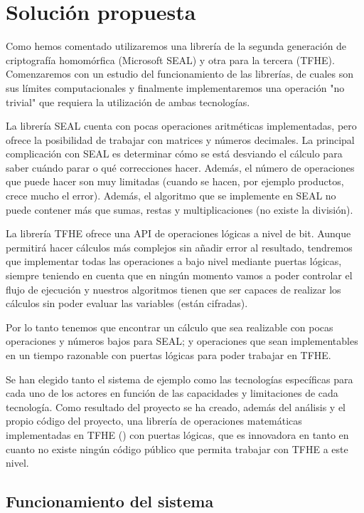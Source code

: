 \chapter{Solución propuesta}
\label{chap:poc}

Como hemos comentado utilizaremos una librería de la segunda generación de criptografía homomórfica (Microsoft SEAL) y otra para la tercera (TFHE). Comenzaremos con un estudio del funcionamiento de las librerías, de cuales son sus límites computacionales y finalmente implementaremos una operación "no trivial" que requiera la utilización de ambas tecnologías.

La librería SEAL cuenta con pocas operaciones aritméticas implementadas, pero ofrece la posibilidad de trabajar con matrices y números decimales. La principal complicación con SEAL es determinar cómo se está desviando el cálculo para saber cuándo parar o qué correcciones hacer. Además, el número de operaciones que puede hacer son muy limitadas (cuando se hacen, por ejemplo productos, crece mucho el error). Además, el algoritmo que se implemente en SEAL no puede contener más que sumas, restas y multiplicaciones (no existe la división).

La librería TFHE ofrece una API de operaciones lógicas a nivel de bit. Aunque permitirá hacer cálculos más complejos sin añadir error al resultado, tendremos que implementar todas las operaciones a bajo nivel mediante puertas lógicas, siempre teniendo en cuenta que en ningún momento vamos a poder controlar el flujo de ejecución y nuestros algoritmos tienen que ser capaces de realizar los cálculos sin poder evaluar las variables (están cifradas).

Por lo tanto tenemos que encontrar un cálculo que sea realizable con pocas operaciones y números bajos para SEAL; y operaciones que sean implementables en un tiempo razonable con puertas lógicas para poder trabajar en TFHE.

Se han elegido tanto el sistema de ejemplo como las tecnologías específicas para cada uno de los actores en función de las capacidades y limitaciones de cada tecnología. Como resultado del proyecto se ha creado, además del análisis y el propio código del proyecto, una librería de operaciones matemáticas implementadas en TFHE (\cite{junquera_tfhe_2019}) con puertas lógicas, que es innovadora en tanto en cuanto no existe ningún código público que permita trabajar con TFHE a este nivel.

\section{Funcionamiento del sistema}

